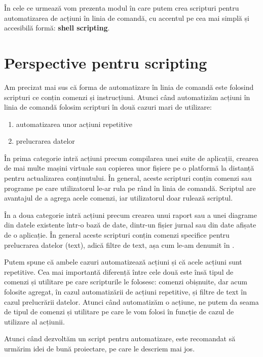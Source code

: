 În cele ce urmează vom prezenta modul în care putem crea scripturi pentru automatizarea de acțiuni în linia de comandă, cu accentul pe cea mai simplă și accesibilă formă: \textbf{shell scripting}.

\section{Perspective pentru scripting}
\label{sec:auto:how}

Am precizat mai sus că forma de automatizare în linia de comandă este folosind scripturi ce conțin comenzi și instrucțiuni.
Atunci când automatizăm acțiuni în linia de comandă folosim scripturi în două cazuri mari de utilizare:
\begin{enumerate}
  \item automatizarea unor acțiuni repetitive
  \item prelucrarea datelor
\end{enumerate}

În prima categorie intră acțiuni precum compilarea unei suite de aplicații, crearea de mai multe mașini virtuale sau copierea unor fișiere pe o platformă la distanță pentru actualizarea conținutului.
În general, aceste scripturi conțin comenzi sau programe pe care utilizatorul le-ar rula pe rând în linia de comandă.
Scriptul are avantajul de a agrega acele comenzi, iar utilizatorul doar rulează scriptul.

În a doua categorie intră acțiuni precum crearea unui raport sau a unei diagrame din datele existente într-o bază de date, dintr-un fișier jurnal sau din date afișate de o aplicație.
În general aceste scripturi conțin comenzi specifice pentru prelucrarea datelor (text), adică filtre de text, așa cum le-am denumit în .

Putem spune că ambele cazuri automatizează acțiuni și că acele acțiuni sunt repetitive.
Cea mai importantă diferență între cele două este însă tipul de comenzi și utilitare pe care scripturile le folosesc: comenzi obișnuite, dar acum folosite agregat, în cazul automatizării de acțiuni repetitive, și filtre de text în cazul prelucrării datelor.
Atunci când automatizăm o acțiune, ne putem da seama de tipul de comenzi și utilitare pe care le vom folosi în funcție de cazul de utilizare al acțiunii.

Atunci când dezvoltăm un script pentru automatizare, este recomandat să urmărim idei de bună proiectare, pe care le descriem mai jos.

